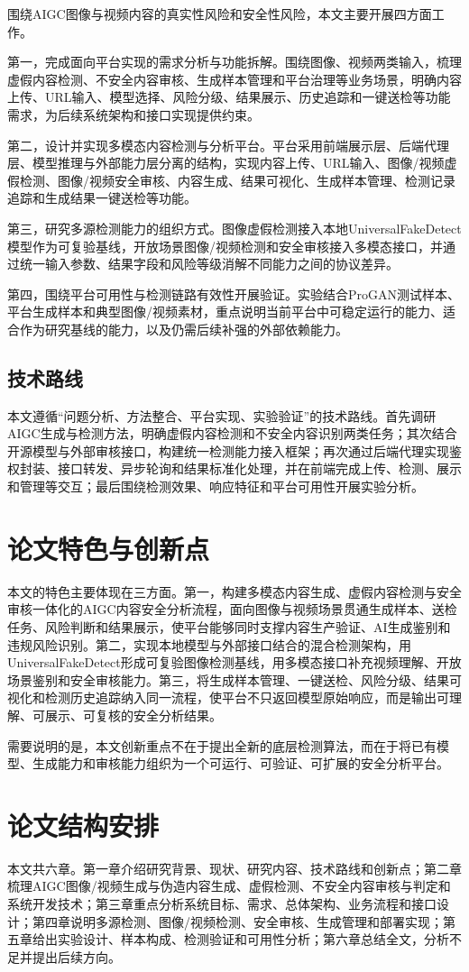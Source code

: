 围绕AIGC图像与视频内容的真实性风险和安全性风险，本文主要开展四方面工作。

第一，完成面向平台实现的需求分析与功能拆解。围绕图像、视频两类输入，梳理虚假内容检测、不安全内容审核、生成样本管理和平台治理等业务场景，明确内容上传、URL输入、模型选择、风险分级、结果展示、历史追踪和一键送检等功能需求，为后续系统架构和接口实现提供约束。

第二，设计并实现多模态内容检测与分析平台。平台采用前端展示层、后端代理层、模型推理与外部能力层分离的结构，实现内容上传、URL输入、图像/视频虚假检测、图像/视频安全审核、内容生成、结果可视化、生成样本管理、检测记录追踪和生成结果一键送检等功能。

第三，研究多源检测能力的组织方式。图像虚假检测接入本地UniversalFakeDetect模型作为可复验基线，开放场景图像/视频检测和安全审核接入多模态接口，并通过统一输入参数、结果字段和风险等级消解不同能力之间的协议差异。

第四，围绕平台可用性与检测链路有效性开展验证。实验结合ProGAN测试样本、平台生成样本和典型图像/视频素材，重点说明当前平台中可稳定运行的能力、适合作为研究基线的能力，以及仍需后续补强的外部依赖能力。

\subsection{技术路线}

本文遵循“问题分析、方法整合、平台实现、实验验证”的技术路线。首先调研AIGC生成与检测方法，明确虚假内容检测和不安全内容识别两类任务；其次结合开源模型与外部审核接口，构建统一检测能力接入框架；再次通过后端代理实现鉴权封装、接口转发、异步轮询和结果标准化处理，并在前端完成上传、检测、展示和管理等交互；最后围绕检测效果、响应特征和平台可用性开展实验分析。

\section{论文特色与创新点}

本文的特色主要体现在三方面。第一，构建多模态内容生成、虚假内容检测与安全审核一体化的AIGC内容安全分析流程，面向图像与视频场景贯通生成样本、送检任务、风险判断和结果展示，使平台能够同时支撑内容生产验证、AI生成鉴别和违规风险识别。第二，实现本地模型与外部接口结合的混合检测架构，用UniversalFakeDetect形成可复验图像检测基线，用多模态接口补充视频理解、开放场景鉴别和安全审核能力。第三，将生成样本管理、一键送检、风险分级、结果可视化和检测历史追踪纳入同一流程，使平台不只返回模型原始响应，而是输出可理解、可展示、可复核的安全分析结果。

需要说明的是，本文创新重点不在于提出全新的底层检测算法，而在于将已有模型、生成能力和审核能力组织为一个可运行、可验证、可扩展的安全分析平台。

\section{论文结构安排}

本文共六章。第一章介绍研究背景、现状、研究内容、技术路线和创新点；第二章梳理AIGC图像/视频生成与伪造内容生成、虚假检测、不安全内容审核与判定和系统开发技术；第三章重点分析系统目标、需求、总体架构、业务流程和接口设计；第四章说明多源检测、图像/视频检测、安全审核、生成管理和部署实现；第五章给出实验设计、样本构成、检测验证和可用性分析；第六章总结全文，分析不足并提出后续方向。
